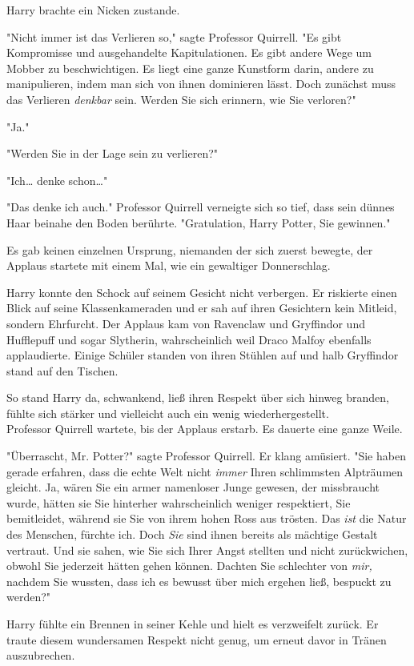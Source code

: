 {Harry brachte ein Nicken zustande.

"Nicht immer ist das Verlieren so," sagte Professor Quirrell. "Es gibt Kompromisse und ausgehandelte Kapitulationen. Es gibt andere Wege um Mobber zu beschwichtigen. Es liegt eine ganze Kunstform darin, andere zu manipulieren, indem man sich von ihnen dominieren lässt. Doch zunächst muss das Verlieren \emph{denkbar} sein. Werden Sie sich erinnern, wie Sie verloren?"

"Ja."

"Werden Sie in der Lage sein zu verlieren?"

"Ich… denke schon…"

"Das denke ich auch." Professor Quirrell verneigte sich so tief, dass sein dünnes Haar beinahe den Boden berührte. "Gratulation, Harry Potter, Sie gewinnen."

Es gab keinen einzelnen Ursprung, niemanden der sich zuerst bewegte, der Applaus startete mit einem Mal, wie ein gewaltiger Donnerschlag.

Harry konnte den Schock auf seinem Gesicht nicht verbergen. Er riskierte einen Blick auf seine Klassenkameraden und er sah auf ihren Gesichtern kein Mitleid, sondern Ehrfurcht. Der Applaus kam von Ravenclaw und Gryffindor und Hufflepuff und sogar Slytherin, wahrscheinlich weil Draco Malfoy ebenfalls applaudierte. Einige Schüler standen von ihren Stühlen auf und halb Gryffindor stand auf den Tischen.

So stand Harry da, schwankend, ließ ihren Respekt über sich hinweg branden, fühlte sich stärker und vielleicht auch ein wenig wiederhergestellt.\\ Professor Quirrell wartete, bis der Applaus erstarb. Es dauerte eine ganze Weile.

"Überrascht, Mr. Potter?" sagte Professor Quirrell. Er klang amüsiert. "Sie haben gerade erfahren, dass die echte Welt nicht \emph{immer} Ihren schlimmsten Alpträumen gleicht. Ja, wären Sie ein armer namenloser Junge gewesen, der missbraucht wurde, hätten sie Sie hinterher wahrscheinlich weniger respektiert, Sie bemitleidet, während sie Sie von ihrem hohen Ross aus trösten. Das \emph{ist} die Natur des Menschen, fürchte ich. Doch \emph{Sie} sind ihnen bereits als mächtige Gestalt vertraut. Und sie sahen, wie Sie sich Ihrer Angst stellten und nicht zurückwichen, obwohl Sie jederzeit hätten gehen können. Dachten Sie schlechter von \emph{mir,} nachdem Sie wussten, dass ich es bewusst über mich ergehen ließ, bespuckt zu werden?"

Harry fühlte ein Brennen in seiner Kehle und hielt es verzweifelt zurück. Er traute diesem wundersamen Respekt nicht genug, um erneut davor in Tränen auszubrechen.

}
